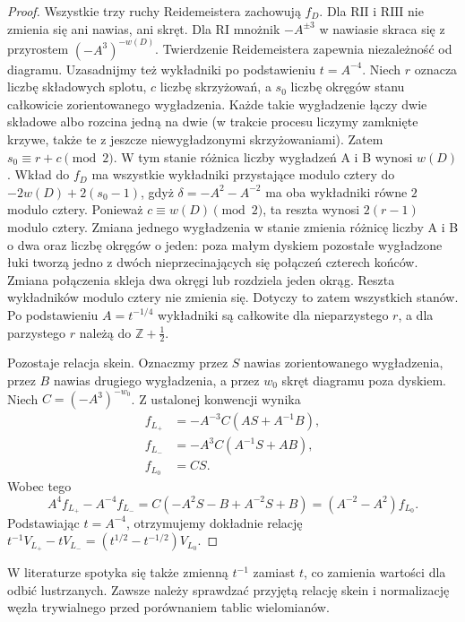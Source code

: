 \begin{proof}
Wszystkie trzy ruchy Reidemeistera zachowują $f_D$.
Dla $\mathrm{R II}$ i $\mathrm{R III}$ nie zmienia się ani
nawias, ani skręt. Dla $\mathrm{R I}$ mnożnik $-A^{\pm3}$
w nawiasie skraca się z przyrostem $(-A^3)^{-w(D)}$.
Twierdzenie Reidemeistera zapewnia niezależność od diagramu.
Uzasadnijmy też wykładniki po podstawieniu $t=A^{-4}$.
Niech $r$ oznacza liczbę składowych splotu,
$c$ liczbę skrzyżowań, a $s_0$ liczbę okręgów stanu
całkowicie zorientowanego wygładzenia.
Każde takie wygładzenie łączy dwie składowe albo rozcina
jedną na dwie (w trakcie procesu liczymy zamknięte
krzywe, także te z jeszcze niewygładzonymi skrzyżowaniami).
Zatem $s_0\equiv r+c\pmod2$.
W tym stanie różnica liczby wygładzeń A i B wynosi $w(D)$.
Wkład do $f_D$ ma wszystkie wykładniki przystające
modulo cztery do $-2w(D)+2(s_0-1)$, gdyż
$\delta=-A^2-A^{-2}$ ma oba wykładniki równe
$2$ modulo cztery. Ponieważ $c\equiv w(D)\pmod2$,
ta reszta wynosi $2(r-1)$ modulo cztery.
Zmiana jednego wygładzenia w stanie zmienia różnicę
liczby A i B o dwa oraz liczbę okręgów o jeden:
poza małym dyskiem pozostałe wygładzone łuki tworzą
jedno z dwóch nieprzecinających się połączeń czterech
końców. Zmiana połączenia skleja dwa okręgi lub
rozdziela jeden okrąg. Reszta wykładników modulo
cztery nie zmienia się. Dotyczy to zatem wszystkich
stanów. Po podstawieniu $A=t^{-1/4}$ wykładniki są
całkowite dla nieparzystego $r$, a dla parzystego $r$
należą do $\mathbb Z+\tfrac12$.

Pozostaje relacja skein. Oznaczmy przez $S$ nawias
zorientowanego wygładzenia, przez $B$ nawias drugiego
wygładzenia, a przez $w_0$ skręt diagramu poza dyskiem.
Niech $C=(-A^3)^{-w_0}$. Z ustalonej konwencji wynika
\[
\begin{aligned}
f_{L_+}&=-A^{-3}C(AS+A^{-1}B),\\
f_{L_-}&=-A^3 C(A^{-1}S+AB),\\
f_{L_0}&=CS.
\end{aligned}
\]
Wobec tego
\[
A^4 f_{L_+}-A^{-4}f_{L_-}
=C(-A^2 S-B+A^{-2}S+B)
=(A^{-2}-A^2)f_{L_0}.
\]
Podstawiając $t=A^{-4}$, otrzymujemy dokładnie relację
$t^{-1}V_{L_+}-tV_{L_-}=(t^{1/2}-t^{-1/2})V_{L_0}$.
\end{proof}

\begin{uwaga}
W literaturze spotyka się także zmienną $t^{-1}$ zamiast $t$,
co zamienia wartości dla odbić lustrzanych. Zawsze należy
sprawdzać przyjętą relację skein i normalizację węzła
trywialnego przed porównaniem tablic wielomianów.
\end{uwaga}

